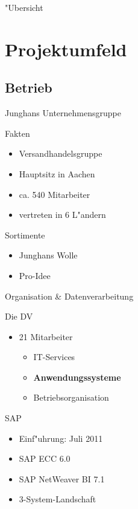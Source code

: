 \setcounter{figure}{0}

\begin{frame}{"Ubersicht}
  \tableofcontents
\end{frame}

\section{Projektumfeld}

\subsection{Betrieb}
\begin{frame}[<+->]{Junghans Unternehmensgruppe}
			\begin{block}{Fakten}
				\begin{itemize}[<+->]
						\item Versandhandelsgruppe
						\item Hauptsitz in Aachen
						\item ca. 540 Mitarbeiter
						\item vertreten in 6 L"andern
				\end{itemize}
			\end{block}

			\begin{block}{Sortimente}
				\begin{itemize}[<+->]
						\item Junghans Wolle
						\item Pro-Idee
				\end{itemize}
			\end{block}
\end{frame}

\begin{frame}[<+->]{Organisation \& Datenverarbeitung}
			\begin{block}{Die DV}
				\begin{itemize}
						\item 21 Mitarbeiter
						\begin{itemize}
							\item IT-Services
							\item \textbf<6>{Anwendungssysteme}
							\item Betriebsorganisation
						\end{itemize}
				\end{itemize}
			\end{block}
			\pause
			\begin{block}{SAP}
				\begin{itemize}[<+->]
						\item Einf"uhrung: Juli 2011
						\item SAP ECC 6.0
						\item SAP NetWeaver BI 7.1
						\item 3-System-Landschaft
				\end{itemize}
			\end{block}
\end{frame}

